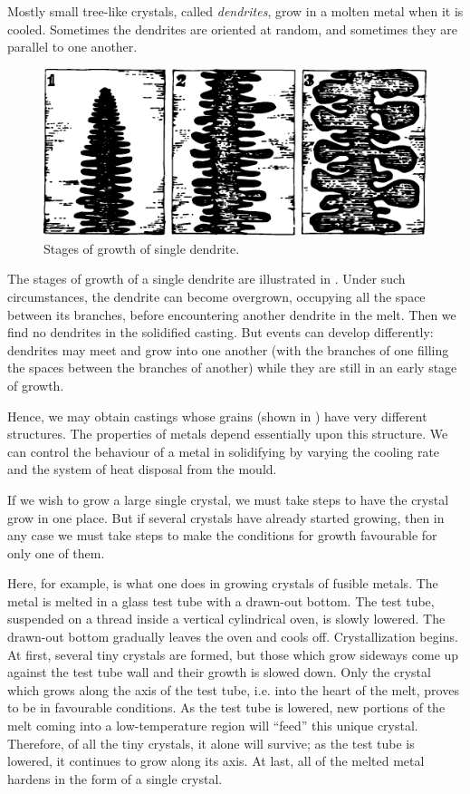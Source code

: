 Mostly small tree-like crystals, called \emph{dendrites}, grow in a molten metal when it is cooled. Sometimes the dendrites are oriented at random, and sometimes they are parallel to one another.
\begin{figure}[!ht]
\centering
\includegraphics[width=\textwidth]{figures/fig-04-09.pdf}
\caption{Stages of growth of single dendrite.}
\label{fig-4.9}
\end{figure}
The stages of growth of a single dendrite are illustrated in . Under such circumstances, the dendrite can become overgrown, occupying all the space between its branches, before encountering another dendrite in the melt. Then we find no dendrites in the solidified casting. But events can develop differently: dendrites may meet and grow into one another (with the branches of one filling the spaces between the branches of another) while they are still in an early stage of growth.

Hence, we may obtain castings whose grains (shown in ) have very different structures. The properties of metals depend essentially upon this structure. We can control the behaviour of a metal in solidifying by varying the cooling rate and the system of heat dis­posal from the mould.

If we wish to grow a large single crystal, we must take steps to have the crystal grow in one place. But if several crystals have already started growing, then in any case we must take steps to make the conditions for growth favourable for only one of them.

Here, for example, is what one does in growing crystals of fusible metals. The metal is melted in a glass test tube with a drawn-out bottom. The test tube, suspended on a thread inside a vertical cylindrical oven, is slowly low­ered. The drawn-out bottom gradually leaves the oven and cools off. Crystallization begins. At first, several tiny crystals are formed, but those which grow sideways come up against the test tube wall and their growth is slowed down. Only the crystal which grows along the axis of the test tube, i.e. into the heart of the melt, proves to be in favourable conditions. As the test tube is lowered, new portions of the melt coming into a low-temperature region will ``feed'' this unique crystal. Therefore, of all the tiny crystals, it alone will survive; as the test tube is lowered, it continues to grow along its axis. At last, all of the melted metal hardens in the form of a single crystal.

